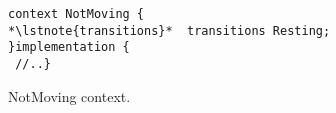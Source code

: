 \begin{figure}[!tb]
\begin{lstlisting}[style=conescframe]
context NotMoving {
*\lstnote{transitions}*  transitions Resting;
}implementation {
 //..}
\end{lstlisting}
\vspace{-4mm}
\caption{NotMoving context.}
  \label{fig:nmc}
\vspace{-2mm}
\end{figure}